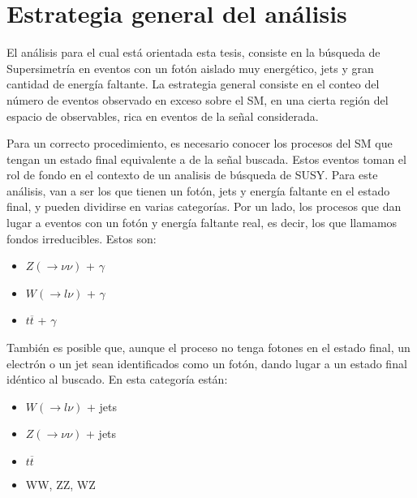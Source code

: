 \chapter{Estrategia general del análisis}


El análisis para el cual está orientada esta tesis, consiste en la búsqueda de Supersimetría en eventos con un fotón aislado muy energético, jets y gran cantidad de energía faltante. La estrategia general consiste en el conteo del número de eventos observado en exceso sobre el SM, en una cierta región del espacio de observables, rica en eventos de la señal considerada.

Para un correcto procedimiento, es necesario conocer los procesos del SM que tengan un estado final equivalente a de la señal buscada. Estos eventos toman el rol de fondo en el contexto de un analisis de búsqueda de SUSY. Para este análisis, van a ser los que tienen un fotón, jets y energía faltante en el estado final, y pueden dividirse en varias categorías. Por un lado, los procesos que dan lugar a eventos con un fotón y energía faltante
real, es decir, los que llamamos fondos irreducibles. Estos son:

\begin{itemize}

	\item $Z(\rightarrow \nu\nu)$ + $\gamma$

	\item $W (\rightarrow l\nu)$ + $\gamma$

	\item $t \overline{t}$ + $\gamma$

\end{itemize}

También es posible que, aunque el proceso no tenga fotones en el estado final, un electrón o un jet sean identificados como un fotón, dando lugar a un estado final idéntico al buscado. En esta categoría están:

\begin{itemize}

	\item $W (\rightarrow l\nu)$ + jets

	\item $Z (\rightarrow \nu\nu)$ + jets

	\item $t \overline{t}$

	\item WW, ZZ, WZ

\end{itemize}

